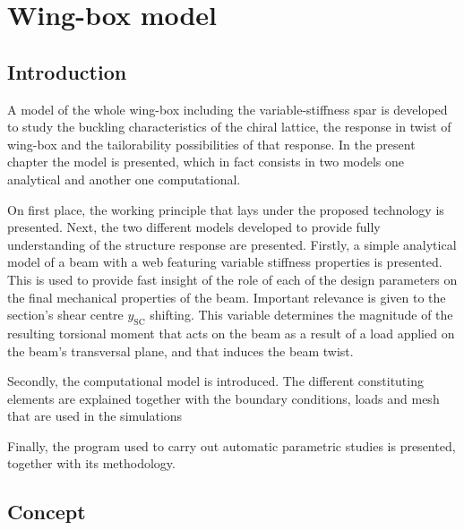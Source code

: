\chapter{Wing-box model} \label{chap:Model}

\section{Introduction} \label{sec:intro_Model}

  A model of the whole wing-box including the variable-stiffness spar is developed to study the buckling characteristics of the chiral lattice, the response in twist of wing-box and the tailorability possibilities of that response. In the present chapter the model is presented, which in fact consists in two models one analytical and another one computational. 

  On first place, the working principle that lays under the proposed technology is presented. Next, the two different models developed to provide fully understanding of the structure response are presented. Firstly, a simple analytical model of a beam with a web featuring variable stiffness properties is presented. This is used to provide fast insight of the role of each of the design parameters on the final mechanical properties of the beam. Important relevance is given to the section's shear centre $y_{\mathrm{SC}}$ shifting. This variable determines the magnitude of the resulting torsional moment that acts on the beam as a result of a load applied on the beam's transversal plane, and that induces the beam twist.

  Secondly, the computational model is introduced. The different constituting elements are explained together with the boundary conditions, loads and mesh that are used in the simulations 

  Finally, the program used to carry out automatic parametric studies is presented, together with its methodology.

\section{Concept} \label{sec:concept_Model}

